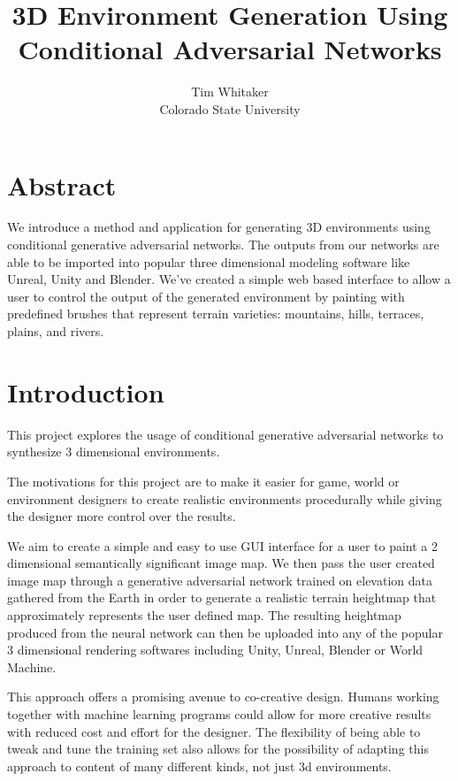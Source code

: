 \documentclass[twocolumn]{article}
\title{3D Environment Generation Using Conditional Adversarial Networks}
\author{Tim Whitaker \\ Colorado State University}
\begin{document}
	\maketitle
	
	\section{Abstract}
	
	We introduce a method and application for generating 3D environments using conditional generative adversarial networks. The outputs from our networks are able to be imported into popular three dimensional modeling software like Unreal, Unity and Blender. We've created a simple web based interface to allow a user to control the output of the generated environment by painting with predefined brushes that represent terrain varieties: mountains, hills, terraces, plains, and rivers.
	
	\section{Introduction}

	This project explores the usage of conditional generative adversarial networks to synthesize 3 dimensional environments.
	
	The motivations for this project are to make it easier for game, world or environment designers to create realistic environments procedurally while giving the designer more control over the results.
	
	We aim to create a simple and easy to use GUI interface for a user to paint a 2 dimensional semantically significant image map. We then pass the user created image map through a generative adversarial network trained on elevation data gathered from the Earth in order to generate a realistic terrain heightmap that approximately represents the user defined map. The resulting heightmap produced from the neural network can then be uploaded into any of the popular 3 dimensional rendering softwares including Unity, Unreal, Blender or World Machine.
	
	This approach offers a promising avenue to co-creative design. Humans working together with machine learning programs could allow for more creative results with reduced cost and effort for the designer. The flexibility of being able to tweak and tune the training set also allows for the possibility of adapting this approach to content of many different kinds, not just 3d environments.
	
\end{document}
